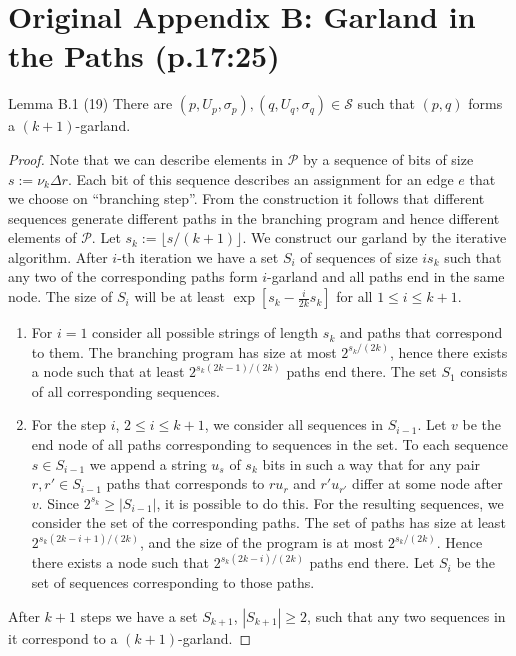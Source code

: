\section*{Original Appendix B: Garland in the Paths (p.17:25)}
\begin{result}{Lemma B.1 (19)}
There are $(p,U_p,\sigma_p),(q,U_q,\sigma_q)\in\mathcal S$ such that $(p,q)$ forms a $(k+1)$-garland.
\end{result}
\begin{proof}
Note that we can describe elements in $\mathcal P$ by a sequence of bits of size $s:=\nu_k\Delta r$. Each bit of this sequence describes an assignment for an edge $e$ that we choose on ``branching step''. From the construction it follows that different sequences generate different paths in the branching program and hence different elements of $\mathcal P$.
Let $s_k:=\lfloor s/(k+1)\rfloor$. We construct our garland by the iterative algorithm. After $i$-th iteration we have a set $S_i$ of sequences of size $is_k$ such that any two of the corresponding paths form $i$-garland and all paths end in the same node. The size of $S_i$ will be at least $\exp[s_k-\frac{i}{2k}s_k]$ for all $1\le i\le k+1$.
\begin{enumerate}
\item For $i=1$ consider all possible strings of length $s_k$ and paths that correspond to them. The branching program has size at most $2^{s_k/(2k)}$, hence there exists a node such that at least $2^{s_k(2k-1)/(2k)}$ paths end there. The set $S_1$ consists of all corresponding sequences.
\item For the step $i$, $2\le i\le k+1$, we consider all sequences in $S_{i-1}$. Let $v$ be the end node of all paths corresponding to sequences in the set. To each sequence $s\in S_{i-1}$ we append a string $u_s$ of $s_k$ bits in such a way that for any pair $r,r'\in S_{i-1}$ paths that corresponds to $ru_r$ and $r'u_{r'}$ differ at some node after $v$. Since $2^{s_k}\ge|S_{i-1}|$, it is possible to do this.
For the resulting sequences, we consider the set of the corresponding paths. The set of paths has size at least $2^{s_k(2k-i+1)/(2k)}$, and the size of the program is at most $2^{s_k/(2k)}$. Hence there exists a node such that $2^{s_k(2k-i)/(2k)}$ paths end there. Let $S_i$ be the set of sequences corresponding to those paths.
\end{enumerate}
After $k+1$ steps we have a set $S_{k+1}$, $|S_{k+1}|\ge2$, such that any two sequences in it correspond to a $(k+1)$-garland.
\end{proof}
